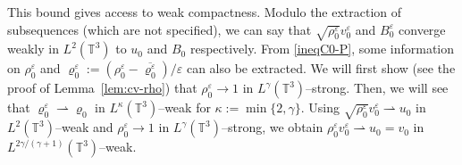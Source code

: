 \documentclass[11pt,reqno]{amsart}
\def \T{{\mathbb{T}}}
\begin{document}
This bound gives access to weak compactness. Modulo the extraction of subsequences (which are not  specified), we can say that $\sqrt{\rho_0^\varepsilon } v_0^\varepsilon$ and $B_0^\varepsilon$ converge weakly in $L^2(\T^3)$ to $u_0$ and $B_0$ respectively. From \eqref{ineqC0-P}, some information on $\rho_0^\varepsilon $ and $ \varrho_0^\varepsilon :=(\rho_0^\varepsilon-\overline{\varrho_0^\varepsilon})/\varepsilon $ can also be extracted. We will first show (see the proof of Lemma~\ref{lem:cv-rho}) that $\rho_0^\varepsilon \rightarrow 1$ in $L^\gamma(\T^3)$--strong. Then, we will see that  $\varrho_0^\varepsilon \rightharpoonup \varrho_0$ in $L^\kappa(\T^3)$--weak for $\kappa :=\min\{2,\gamma\}$. Using $\sqrt{\rho_0^\varepsilon } v_0^\varepsilon \rightharpoonup u_0$ in  $L^2(\T^3)$--weak and $\rho_0^\varepsilon \rightarrow 1$ in $L^\gamma(\T^3)$--strong, we obtain $\rho_0^\varepsilon  v_0^\varepsilon  \rightharpoonup u_0 = v_0 $ in  $L^{2\gamma/(\gamma +1)}(\T^3)$--weak.
\end{document}

